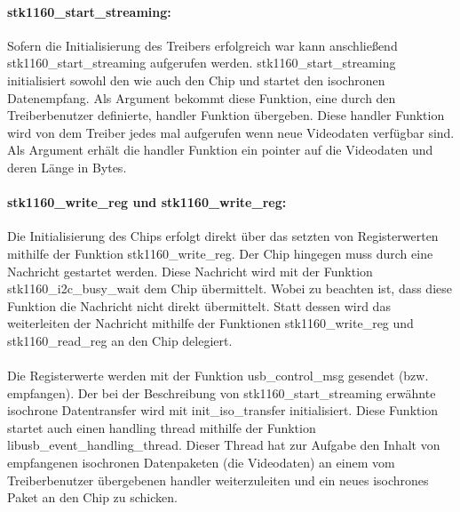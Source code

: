 \paragraph{stk1160\_start\_streaming:}
Sofern die Initialisierung des Treibers erfolgreich war kann anschließend stk1160\_start\_streaming aufgerufen werden. stk1160\_start\_streaming initialisiert sowohl den \stk{} wie auch den \saa{} Chip und startet den isochronen Datenempfang. Als Argument bekommt diese Funktion, eine durch den Treiberbenutzer definierte, handler Funktion übergeben. 
Diese handler Funktion wird von dem Treiber jedes mal aufgerufen wenn neue Videodaten verfügbar sind. Als Argument erhält die handler Funktion ein pointer auf die Videodaten und deren Länge in Bytes.

\paragraph{stk1160\_write\_reg und stk1160\_write\_reg:}
Die Initialisierung des \stk{} Chips erfolgt direkt über das setzten von Registerwerten mithilfe der Funktion stk1160\_write\_reg. Der \saa{} Chip hingegen muss durch eine \iic{} Nachricht gestartet werden. Diese Nachricht wird mit der Funktion stk1160\_i2c\_busy\_wait dem \saa{} Chip übermittelt. Wobei zu beachten ist, dass diese Funktion die Nachricht nicht direkt übermittelt. Statt dessen wird das weiterleiten der Nachricht mithilfe der Funktionen stk1160\_write\_reg und stk1160\_read\_reg an den \stk{} Chip delegiert. 

\paragraph{}
Die Registerwerte werden mit der Funktion usb\_control\_msg gesendet (bzw. empfangen). Der bei der Beschreibung von stk1160\_start\_streaming erwähnte isochrone Datentransfer wird mit init\_iso\_transfer initialisiert. Diese Funktion startet auch einen handling thread mithilfe der Funktion libusb\_event\_handling\_thread. Dieser Thread hat zur Aufgabe den Inhalt von empfangenen isochronen Datenpaketen (die Videodaten) an einem vom Treiberbenutzer übergebenen handler weiterzuleiten und ein neues isochrones Paket an den \stk{} Chip zu schicken. 

